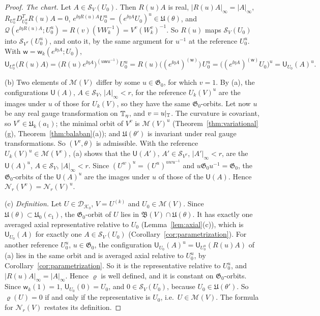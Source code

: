 \begin{proof}
\emph{The chart.} Let $A\in\mathcal S_V(U_0)$. Then $R(u)A$ is real, $|R(u)A|_\infty=|A|_\infty$, $R_{U_0^u}D^T_{U_0^u}R(u)A=0$, $e^{\ii\eta R(u)A}U_0^u=(e^{\ii\eta A}U_0)^u\in\mathfrak U(\theta)$, and $\mathcal Q(e^{\ii\eta R(u)A};U_0^u)=R(v)(VW_k^{-1})=V^v(W_k^v)^{-1}$. So $R(u)$ maps $\mathcal S_V(U_0)$ into $\mathcal S_{V^v}(U_0^u)$, and onto it, by the same argument for $u^{-1}$ at the reference $U_0^u$. With $\mathsf w=\mathsf w_k(e^{\ii\eta A};U_0)$,
\[
\mathsf U_{U_0^u}\big(R(u)A\big)=\big(R(u)e^{\ii\eta A}\big)^{(u\mathsf wu^{-1})}U_0^u=R(u)\big((e^{\ii\eta A})^{(\mathsf w)}\big)\,U_0^u=\big((e^{\ii\eta A})^{(\mathsf w)}U_0\big)^u=\mathsf U_{U_0}(A)^u .
\]

(b) Two elements of $\mathscr M(V)$ differ by some $u\in\mathfrak G_0$, for which $v=1$. By (a), the configurations $\mathsf U(A)$, $A\in\mathcal S_V$, $|A|_\infty<r$, for the reference $U_k(V)^u$ are the images under $u$ of those for $U_k(V)$, so they have the same $\mathfrak G_0$-orbits. Let now $u$ be any real gauge transformation on $\mathbb T_\eta$, and $v=u|_\mathbb T$. The curvature is covariant, so $V^v\in\mathfrak U_k(a_1)$; the minimal orbit of $V^v$ is $\mathscr M(V)^u$ (Theorem~\ref{thm:variational}(g), Theorem~\ref{thm:balaban}(a)); and $\mathfrak U(\theta')$ is invariant under real gauge transformations. So $(V^v,\theta)$ is admissible. With the reference $U_k(V)^u\in\mathscr M(V^v)$, (a) shows that the $\mathsf U(A')$, $A'\in\mathcal S_{V^v}$, $|A'|_\infty<r$, are the $\mathsf U(A)^u$, $A\in\mathcal S_V$, $|A|_\infty<r$. Since $(U^w)^u=(U^u)^{uwu^{-1}}$ and $u\mathfrak G_0u^{-1}=\mathfrak G_0$, the $\mathfrak G_0$-orbits of the $\mathsf U(A)^u$ are the images under $u$ of those of the $\mathsf U(A)$. Hence $\mathscr N_r(V^v)=\mathscr N_r(V)^u$.

(c) \emph{Definition.} Let $U\in\mathcal D_{\mathcal K_0}$, $V=U^{(k)}$ and $U_0\in\mathscr M(V)$. Since $\mathfrak U(\theta)\subset\mathfrak U_0(c_1)$, the $\mathfrak G_0$-orbit of $U$ lies in $\mathfrak B(V)\cap\mathfrak U(\theta)$. It has exactly one averaged axial representative relative to $U_0$ (Lemma~\ref{lem:axial}(c)), which is $\mathsf U_{U_0}(A)$ for exactly one $A\in\mathcal S_V(U_0)$ (Corollary~\ref{cor:parametrization}). For another reference $U_0^u$, $u\in\mathfrak G_0$, the configuration $\mathsf U_{U_0}(A)^u=\mathsf U_{U_0^u}(R(u)A)$ of (a) lies in the same orbit and is averaged axial relative to $U_0^u$, by Corollary~\ref{cor:parametrization}. So it is the representative relative to $U_0^u$, and $|R(u)A|_\infty=|A|_\infty$. Hence $\varrho$ is well defined, and it is constant on $\mathfrak G_0$-orbits. Since $\mathsf w_k(1)=1$, $\mathsf U_{U_0}(0)=U_0$, and $0\in\mathcal S_V(U_0)$, because $U_0\in\mathfrak U(\theta')$. So $\varrho(U)=0$ if and only if the representative is $U_0$, i.e.\ $U\in\mathscr M(V)$. The formula for $\mathscr N_r(V)$ restates its definition.


\end{proof}
